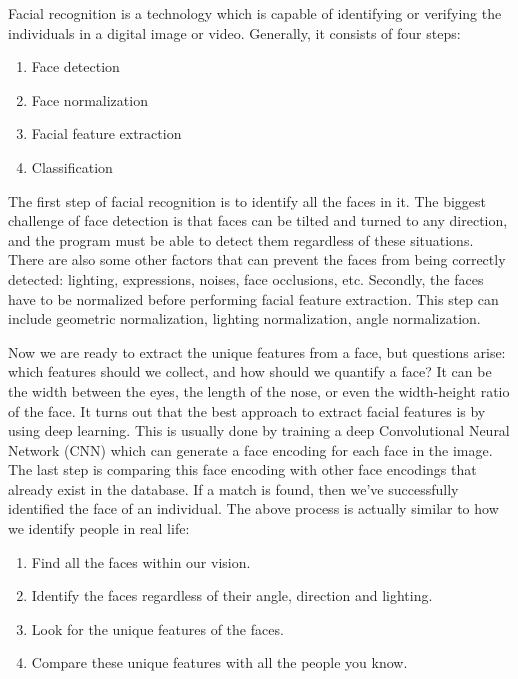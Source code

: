 Facial recognition is a technology which is capable of identifying or verifying the individuals in a digital image or video.
Generally, it consists of four steps:
\vspace{0.3cm}

\begin{enumerate}
  \item Face detection
  \item Face normalization
  \item Facial feature extraction
  \item Classification
\end{enumerate}
\setstretch{\myContentLineSpacing}

The first step of facial recognition is to identify all the faces in it. The biggest challenge of face detection
is that faces can be tilted and turned to any direction, and the program must be able to detect them regardless of
these situations. There are also some other factors that can prevent the faces from being correctly detected:
lighting, expressions, noises, face occlusions, etc. Secondly, the faces have to be normalized before performing
facial feature extraction. This step can include geometric normalization, lighting normalization, angle normalization.
\vspace{0.3cm}

Now we are ready to extract the unique features from a face, but questions arise: which features should we collect, and
how should we quantify a face? It can be the width between the eyes, the length of the nose, or even the width-height ratio
of the face. It turns out that the best approach to extract facial features is by using deep learning.
This is usually done by training a deep Convolutional Neural Network (CNN) which can generate a face encoding for each face
in the image. The last step is comparing this face encoding with other face encodings that already exist in the database.
If a match is found, then we've successfully identified the face of an individual. The above process is actually similar to
how we identify people in real life:
\vspace{0.3cm}

\begin{enumerate}
  \item Find all the faces within our vision.
  \item Identify the faces regardless of their angle, direction and lighting.
  \item Look for the unique features of the faces.
  \item Compare these unique features with all the people you know.
\end{enumerate}
\setstretch{\myContentLineSpacing}


